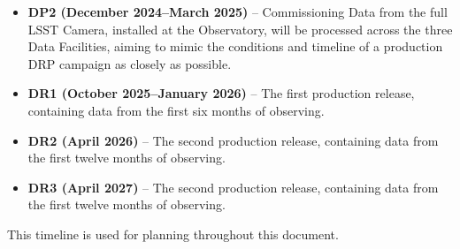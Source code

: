 \begin{itemize}
\item {\bf DP2 (December 2024--March 2025)} – Commissioning Data from
  the full LSST Camera, installed at the Observatory, will be
  processed across the three Data Facilities, aiming to mimic the
  conditions and timeline of a production DRP campaign as closely as
  possible.

\item {\bf DR1 (October 2025--January 2026)} -- The first production release,
  containing data from the first six months of observing.
  
\item {\bf DR2 (April 2026)} -- The second production release, containing data from the first twelve months of observing.
  
\item {\bf DR3 (April 2027)} -- The second production release, containing data from the first twelve months of observing.
  
\end{itemize}

This timeline is used for planning throughout this document.
